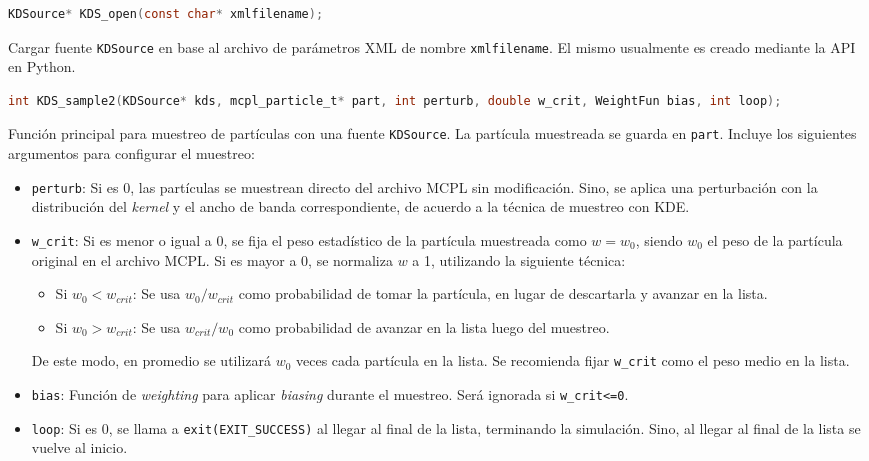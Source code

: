 \begin{footnotesize}
\begin{lstlisting}[language=C]
KDSource* KDS_open(const char* xmlfilename);
\end{lstlisting}
\begin{addmargin}[0.5cm]{0cm}
Cargar fuente \verb|KDSource| en base al archivo de parámetros XML de nombre \verb|xmlfilename|. El mismo usualmente es creado mediante la API en Python.
\end{addmargin}

\begin{lstlisting}[language=C]
int KDS_sample2(KDSource* kds, mcpl_particle_t* part, int perturb, double w_crit, WeightFun bias, int loop);
\end{lstlisting}
\begin{addmargin}[0.5cm]{0cm}
Función principal para muestreo de partículas con una fuente \verb|KDSource|. La partícula muestreada se guarda en \verb|part|. Incluye los siguientes argumentos para configurar el muestreo:
\begin{itemize}
	\item \verb|perturb|: Si es 0, las partículas se muestrean directo del archivo MCPL sin modificación. Sino, se aplica una perturbación con la distribución del \emph{kernel} y el ancho de banda correspondiente, de acuerdo a la técnica de muestreo con KDE.
	\item \verb|w_crit|: Si es menor o igual a 0, se fija el peso estadístico de la partícula muestreada como $w=w_0$, siendo $w_0$ el peso de la partícula original en el archivo MCPL. Si es mayor a 0, se normaliza $w$ a 1, utilizando la siguiente técnica:
	\begin{itemize}
		\item Si $w_0<w_{crit}$: Se usa $w_0/w_{crit}$ como probabilidad de tomar la partícula, en lugar de descartarla y avanzar en la lista.
		\item Si $w_0>w_{crit}$: Se usa $w_{crit}/w_0$ como probabilidad de avanzar en la lista luego del muestreo.
	\end{itemize}
	De este modo, en promedio se utilizará $w_0$ veces cada partícula en la lista. Se recomienda fijar \verb|w_crit| como el peso medio en la lista.
	\item \verb|bias|: Función de \emph{weighting} para aplicar \emph{biasing} durante el muestreo. Será ignorada si \verb|w_crit<=0|.
	\item \verb|loop|: Si es 0, se llama a \verb|exit(EXIT_SUCCESS)| al llegar al final de la lista, terminando la simulación. Sino, al llegar al final de la lista se vuelve al inicio.
\end{itemize}
\end{addmargin}


\end{footnotesize}
